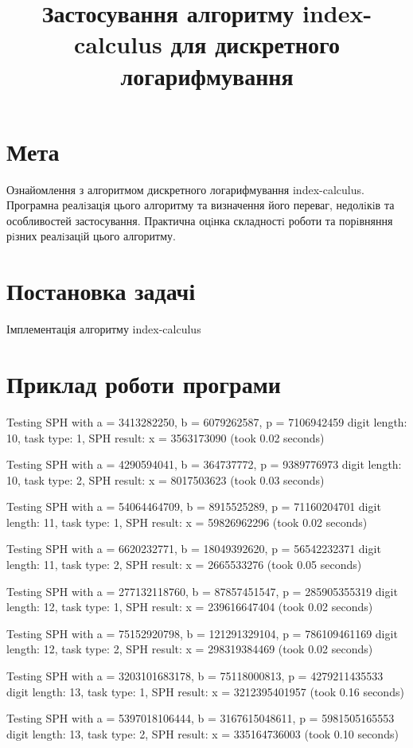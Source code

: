 \documentclass{article}
\title{Застосування алгоритму index-calculus для дискретного логарифмування}
\date{}
\begin{document}
\maketitle

\section{Мета}
\quad Ознайомлення з алгоритмом дискретного логарифмування index-calculus. Програмна реалiзацiя
цього алгоритму та визначення його переваг, недолiкiв та особливостей застосування. Практична оцiнка
складностi роботи та порiвняння рiзних реалiзацiй цього алгоритму.

\section{Постановка задачі}
\quad Імплементація алгоритму index-calculus

\section{Приклад роботи програми}
\quad 
Testing SPH with a = 3413282250, b = 6079262587, p = 7106942459
digit length: 10, task type: 1, SPH result: x = 3563173090 (took 0.02 seconds)

Testing SPH with a = 4290594041, b = 364737772, p = 9389776973
digit length: 10, task type: 2, SPH result: x = 8017503623 (took 0.03 seconds)

Testing SPH with a = 54064464709, b = 8915525289, p = 71160204701
digit length: 11, task type: 1, SPH result: x = 59826962296 (took 0.02 seconds)

Testing SPH with a = 6620232771, b = 18049392620, p = 56542232371
digit length: 11, task type: 2, SPH result: x = 2665533276 (took 0.05 seconds)

Testing SPH with a = 277132118760, b = 87857451547, p = 285905355319
digit length: 12, task type: 1, SPH result: x = 239616647404 (took 0.02 seconds)

Testing SPH with a = 75152920798, b = 121291329104, p = 786109461169
digit length: 12, task type: 2, SPH result: x = 298319384469 (took 0.02 seconds)

Testing SPH with a = 3203101683178, b = 75118000813, p = 4279211435533
digit length: 13, task type: 1, SPH result: x = 3212395401957 (took 0.16 seconds)

Testing SPH with a = 5397018106444, b = 3167615048611, p = 5981505165553
digit length: 13, task type: 2, SPH result: x = 335164736003 (took 0.10 seconds)
\end{document}
